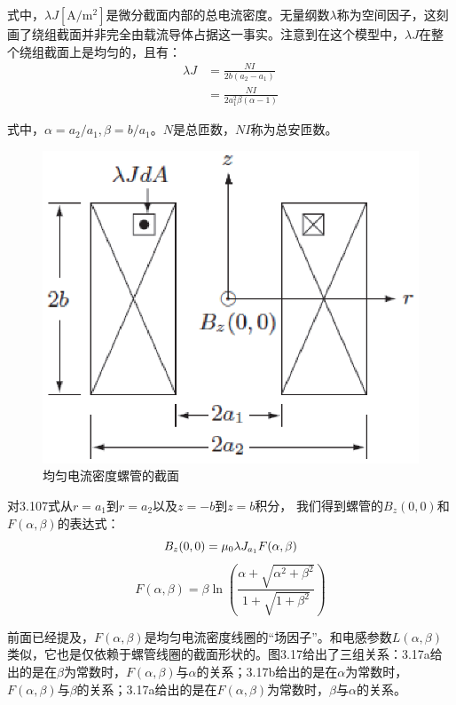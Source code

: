式中，$\lambda J\mathrm{[A/m^2]}$是微分截面内部的总电流密度。无量纲数$\lambda$称为空间因子，这刻画了绕组截面并非完全由载流导体占据这一事实。注意到在这个模型中，$\lambda J$在整个绕组截面上是均匀的，且有：
\begin{subequations}
\begin{align}
\lambda J&=\frac{NI}{2b(a_2-a_1)}\\
&=\frac{NI}{2a_1^2\beta(\alpha-1)}%
\end{align}
\end{subequations}

式中，$\alpha=a_2/a_1,\beta=b/a_1$。$N$是总匝数，$NI$称为总安匝数。
\begin{figure}[htbp]
  \centering
 \includegraphics[scale=0.7]{chpt3/figs/fig3.16.eps}
  \caption{均匀电流密度螺管的截面}
\end{figure}

对3.107式从$r=a_1$到$r=a_2$以及$z=-b$到$z=b$积分，
我们得到螺管的$B_z(0,0)$和$F(\alpha,\beta)$的表达式：
\begin{equation}
B_z(0,0)=\mu_0\lambda J_{a_1}F(\alpha,\beta)\\ %
\end{equation}
\begin{equation*}
F(\alpha,\beta)=\beta \ln\left(\frac{\alpha+\sqrt{\alpha^2+\beta^2}}{1+\sqrt{1+\beta^2}}\right) \tag{3.13b}
\end{equation*}

前面已经提及，$F(\alpha,\beta)$是均匀电流密度线圈的“场因子”。和电感参数$L(\alpha,\beta)$类似，它也是仅依赖于螺管线圈的截面形状的。图3.17给出了三组关系：3.17a给出的是在$\beta$为常数时，$F(\alpha,\beta)$与$\alpha$的关系；3.17b给出的是在$\alpha$为常数时，$F(\alpha,\beta)$与$\beta$的关系；3.17a给出的是在$F(\alpha,\beta)$为常数时，$\beta$与$\alpha$的关系。

